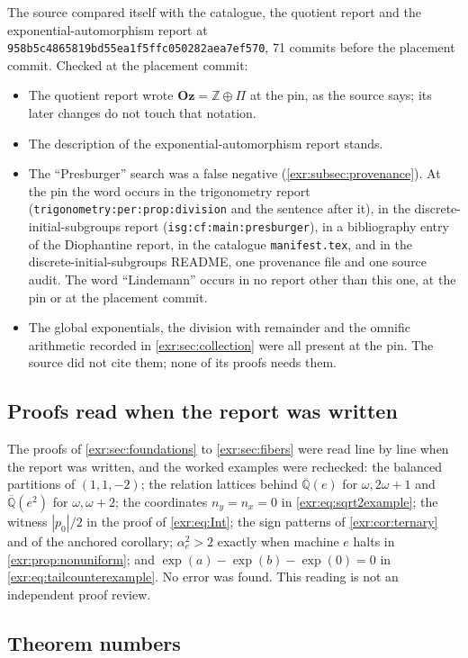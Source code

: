 \documentclass[11pt,letterpaper]{article}
\numberwithin{equation}{section}
\theoremstyle{definition}
\theoremstyle{remark}
\newcommand{\Oz}{\mathbf{Oz}}
\newcommand{\Z}{\mathbb Z}
\newcommand{\Qb}{\overline{\mathbb Q}}
\newcommand{\repoSHA}{\nolinkurl{958b5c4865819bd55ea1f5ffc050282aea7ef570}}
\newcommand{\rpath}[1]{\nolinkurl{#1}}%
\newcommand{\lbl}[1]{\nolinkurl{#1}}%
\begin{document}
The source compared itself with the catalogue, the quotient report and the
exponential-automorphism report at \repoSHA, 71 commits before the placement
commit. Checked at the placement commit:
\begin{itemize}[leftmargin=*,itemsep=3pt]
\item The quotient report wrote $\Oz=\Z\oplus\Pi$ at the pin, as the source
says; its later changes do not touch that notation.
\item The description of the exponential-automorphism report stands.
\item The ``Presburger'' search was a false negative
(\cref{exr:subsec:provenance}). At the pin the word occurs in the
trigonometry report (\lbl{trigonometry:per:prop:division} and the sentence
after it), in the discrete-initial-subgroups report
(\lbl{isg:cf:main:presburger}), in a bibliography entry of the Diophantine
report, in the catalogue \rpath{manifest.tex}, and in the
discrete-initial-subgroups README, one provenance file and one source audit. The word ``Lindemann'' occurs in no report other than this
one, at the pin or at the placement commit.
\item The global exponentials, the division with remainder and the omnific
arithmetic recorded in \cref{exr:sec:collection} were all present at the
pin. The source did not cite them; none of its proofs needs them.
\end{itemize}

\subsection{Proofs read when the report was written}\label{exr:app:checked}

The proofs of \cref{exr:sec:foundations} to \cref{exr:sec:fibers} were read
line by line when the report was written, and the worked examples were
rechecked: the balanced partitions of $(1,1,-2)$; the relation lattices
behind $\Qb(e)$ for $\omega,2\omega+1$ and $\Qb(e^2)$ for $\omega,\omega+2$;
the coordinates $n_y=n_x=0$ in \eqref{exr:eq:sqrt2example}; the witness
$|p_0|/2$ in the proof of \eqref{exr:eq:Int}; the sign patterns of
\cref{exr:cor:ternary} and of the anchored corollary; $\alpha_e^2>2$ exactly
when machine $e$ halts in \cref{exr:prop:nonuniform}; and
$\exp(a)-\exp(b)-\exp(0)=0$ in \eqref{exr:eq:tailcounterexample}. No error was
found. This reading is not an independent proof review.

\subsection{Theorem numbers}\label{exr:app:numbers}
\end{document}
